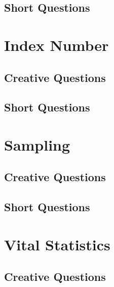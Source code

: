 \documentclass[a4paper,oneside, margin=1.4in]{book}
\begin{document}
\section{Short Questions}

\chapter{Index Number} 
\section{Creative Questions}


\section{Short Questions}

\chapter{Sampling} 
\section{Creative Questions}


\section{Short Questions}

\chapter{Vital Statistics} 
\section{Creative Questions}
\end{document}
